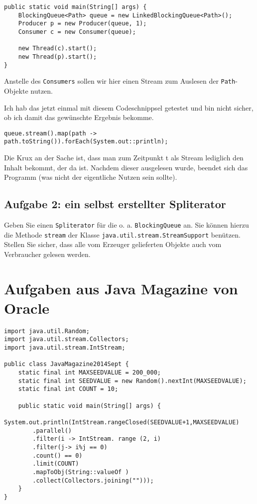 \begin{verbatim}
public static void main(String[] args) {
    BlockingQueue<Path> queue = new LinkedBlockingQueue<Path>();
    Producer p = new Producer(queue, 1);
    Consumer c = new Consumer(queue);
    
    new Thread(c).start();
    new Thread(p).start();
}
\end{verbatim}

Anstelle des \texttt{Consumers} sollen wir hier einen Stream zum
Auslesen der \texttt{Path}-Objekte nutzen.

Ich hab das jetzt einmal mit diesem Codeschnippsel getestet und bin
nicht sicher, ob ich damit das gewünschte Ergebnis bekomme.

\begin{verbatim}
queue.stream().map(path -> path.toString()).forEach(System.out::println);
\end{verbatim}

Die Krux an der Sache ist, dass man zum Zeitpunkt t als Stream lediglich
den Inhalt bekommt, der da ist. Nachdem dieser ausgelesen wurde, beendet
sich das Programm (was nicht der eigentliche Nutzen sein sollte).

\subsection{Aufgabe 2: ein selbst erstellter
Spliterator}\label{aufgabe-2-ein-selbst-erstellter-spliterator}

Geben Sie einen \texttt{Spliterator} für die o. a.
\texttt{BlockingQueue} an. Sie können hierzu die Methode \texttt{stream}
der Klasse \texttt{java.util.stream.StreamSupport} benützen. Stellen Sie
sicher, dass alle vom Erzeuger gelieferten Objekte auch vom Verbraucher
gelesen werden.

\section{Aufgaben aus Java Magazine von
Oracle}\label{aufgaben-aus-java-magazine-von-oracle}

\begin{verbatim}
import java.util.Random;
import java.util.stream.Collectors;
import java.util.stream.IntStream;

public class JavaMagazine2014Sept {
    static final int MAXSEEDVALUE = 200_000;
    static final int SEEDVALUE = new Random().nextInt(MAXSEEDVALUE);
    static final int COUNT = 10;

    public static void main(String[] args) {
        System.out.println(IntStream.rangeClosed(SEEDVALUE+1,MAXSEEDVALUE)
        .parallel()
        .filter(i -> IntStream. range (2, i)
        .filter(j-> i%j == 0)
        .count() == 0)
        .limit(COUNT)
        .mapToObj(String::valueOf )
        .collect(Collectors.joining("")));
    }
}
\end{verbatim}

